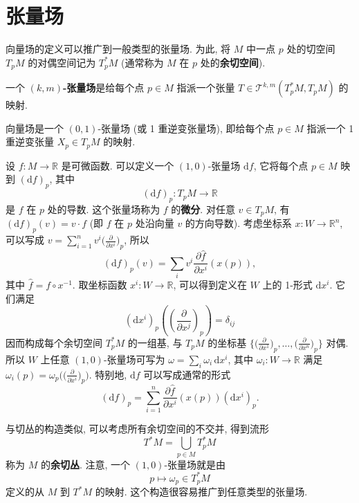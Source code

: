 \section{张量场}\label{sec:tensor-fields}

向量场的定义可以推广到一般类型的张量场. 为此, 将 $M$ 中一点 $p$ 处的切空间 $T_pM$ 的对偶空间记为 $T_p^*M$ (通常称为 $M$ 在 $p$ 处的\textbf{余切空间}).

\begin{RiemannDefinition}\label{def:tensor-field}
一个 \textbf{$(k,m)$-张量场}是给每个点 $p\in M$ 指派一个张量 $T\in\mathcal{T}^{k,m}(T_p^*M,T_pM)$ 的映射.
\end{RiemannDefinition}

\begin{RiemannExample}\label{ex:vector-field-as-a-tensor-field}
向量场是一个 $(0,1)$-张量场 (或 1 重逆变张量场), 即给每个点 $p\in M$ 指派一个 1 重逆变张量 $X_p\in T_pM$ 的映射.
\end{RiemannExample}

\begin{RiemannExample}\label{ex:differential-is-covariant-tensor-field}
设 $f:M\to\mathbb{R}$ 是可微函数. 可以定义一个 $(1,0)$-张量场 $\mathrm{d}f$, 它将每个点 $p\in M$ 映到 $(\mathrm{d}f)_p$, 其中
\[
  (\mathrm{d}f)_p:T_pM\to\mathbb{R}
\]
是 $f$ 在 $p$ 处的导数. 这个张量场称为 $f$ 的\textbf{微分}. 对任意 $v\in T_pM$, 有 $(\mathrm{d}f)_p(v)=v\cdot f$ (即 $f$ 在 $p$ 处沿向量 $v$ 的方向导数). 考虑坐标系 $x:W\to\mathbb{R}^n$, 可以写成 $v=\sum_{i=1}^nv^i\bigl(\frac{\partial}{\partial x^i}\bigr)_p$, 所以
\[
  (\mathrm{d}f)_p(v)=\sum_i v^i\frac{\partial\widehat f}{\partial x^i}(x(p)),
\]
其中 $\widehat f=f\circ x^{-1}$. 取坐标函数 $x^i:W\to\mathbb{R}$, 可以得到定义在 $W$ 上的 1-形式 $\mathrm{d}x^i$. 它们满足
\[
  (\mathrm{d}x^i)_p\left(\left(\frac{\partial}{\partial x^j}\right)_p\right)=\delta_{ij}
\]
因而构成每个余切空间 $T_p^*M$ 的一组基, 与 $T_pM$ 的坐标基 $\bigl\{\bigl(\frac{\partial}{\partial x^1}\bigr)_p,\ldots,\bigl(\frac{\partial}{\partial x^n}\bigr)_p\bigr\}$ 对偶. 所以 $W$ 上任意 $(1,0)$-张量场可写为 $\omega=\sum_i\omega_i\,\mathrm{d}x^i$, 其中 $\omega_i:W\to\mathbb{R}$ 满足 $\omega_i(p)=\omega_p\bigl(\bigl(\frac{\partial}{\partial x^i}\bigr)_p\bigr)$. 特别地, $\mathrm{d}f$ 可以写成通常的形式
\[
  (\mathrm{d}f)_p=\sum_{i=1}^n\frac{\partial\widehat f}{\partial x^i}(x(p))(\mathrm{d}x^i)_p.
\]
\end{RiemannExample}

\begin{RiemannRemark}\label{rem:cotangent-bundle}
与切丛的构造类似, 可以考虑所有余切空间的不交并, 得到流形
\[
  T^*M=\bigcup_{p\in M}T_p^*M
\]
称为 $M$ 的\textbf{余切丛}. 注意, 一个 $(1,0)$-张量场就是由
\[
  p\mapsto\omega_p\in T_p^*M
\]
定义的从 $M$ 到 $T^*M$ 的映射. 这个构造很容易推广到任意类型的张量场.
\end{RiemannRemark}

